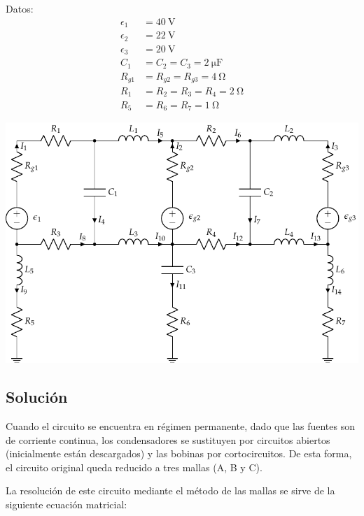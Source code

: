 \documentclass[10pt]{article}
\begin{document}
\begin{minipage}[c]{0.2\linewidth}
  Datos:
  \begin{align*}
    \epsilon_{1}&=\SI{40}{\volt}\\
    \epsilon_{2}&=\SI{22}{\volt}\\
    \epsilon_{3}&=\SI{20}{\volt}\\
    C_{1}&=C_{2}=C_{3}=\SI{2}{\micro\farad}\\
    R_{g1}&=R_{g2}=R_{g3}=\SI{4}{\ohm}\\
    R_{1}&=R_{2}=R_{3}=R_{4}=\SI{2}{\ohm}\\
    R_{5}&=R_{6}=R_{7}=\SI{1}{\ohm}
  \end{align*}
\end{minipage}
\begin{minipage}[c]{0.8\linewidth}
  \includegraphics[scale = 0.8]{figs/mallas_condensadores_bobinas.pdf}
\end{minipage}

\subsection*{Solución}

Cuando el circuito se encuentra en régimen permanente, dado que las
fuentes son de corriente continua, los condensadores se sustituyen
por circuitos abiertos (inicialmente están descargados) y las bobinas
por cortocircuitos. De esta forma, el circuito original queda reducido
a tres mallas (A, B y C).

La resolución de este circuito mediante el método de las mallas se
sirve de la siguiente ecuación matricial:
\end{document}
